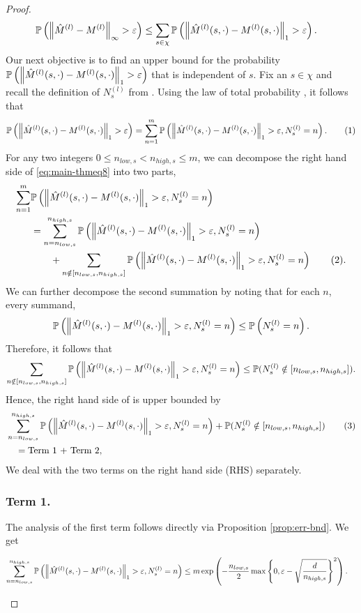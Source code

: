\documentclass[opre,sglanonrev]{informs4}
\numberwithin{equation}{section}
\newcommand{\pow}[1]{^{(#1)}}
\newcommand{\Pbb}{\mathbb{P}}
\newcommand{\hatmls}{\Hat{M}^{(l)}(s,\cdot)}
\newcommand{\mls}{{M}^{(l)}(s,\cdot)}
\newcommand\numberthis{\addtocounter{equation}{1}\tag{\theequation}}
\newcommand{\prob}{\Pbb}
\newcommand{\eps}{\varepsilon}
\renewcommand{\epsilon}{\eps}
\begin{document}
\begin{APPENDICES}
\begin{proof}
\begin{align*}
    \prob\left(\left\|\Hat{M}^{(l)}-M^{(l)}\right\|_{\infty}>\epsilon  \right) & \leq \sum_{s\in\chi} \prob\left(\left\|\hatmls-\mls\right\|_1 > \epsilon\right).
\end{align*}
Our next objective is to find an upper bound for the probability $\prob\left(\left\|\hatmls-\mls\right\|_1 > \epsilon\right)$ that is independent of $s$.
Fix an $s \in \chi$ and recall the definition of $N_s\pow{l}$ from . Using the law of total probability \citep[Proposition 4.1]{gut2005probability}, it follows that
\begin{align*}
    \prob\left(\left\|\hatmls-\mls\right\|_1 > \epsilon\right)=\sum_{n=1}^m \prob\left(\left\|\hatmls-\mls\right\|_1 > \epsilon, N_s^{(l)}=n \right).\numberthis\label{eq:main-thmeq8}
\end{align*}
For any two integers $0 \leq n_{low,s} < n_{high,s} \leq m$, we can decompose the right hand side of \cref{eq:main-thmeq8} into two parts, 
\begin{align*}
     \sum_{n=1}^{m} & \prob\left(\left\|\hatmls-\mls\right\|_1 > \epsilon, N_s^{(l)}=n \right)\\ & = \sum_{n=n_{low,s}}^{n_{high,s}} \prob\left(\left\|\hatmls-\mls\right\|_1 > \epsilon, N_s^{(l)}=n \right)\\
     & \qquad +\sum_{n\notin [n_{low,s} ,n_{high,s}]} \prob\left(\left\|\hatmls-\mls\right\|_1 > \epsilon, N_s^{(l)}=n \right)\numberthis\label{eq:main-thmeq1}.
\end{align*}
We can further decompose the second summation by noting that for each $n$, every summand,
\[
\prob\left(\left\|\hatmls-\mls\right\|_1 > \epsilon, N_s^{(l)}=n \right) \leq \prob\left(N_s^{(l)}=n \right).
\]
Therefore, it follows that
\[
\sum_{n\notin [n_{low,s} ,n_{high,s}]} \prob\left(\left\|\hatmls-\mls\right\|_1 > \epsilon, N_s^{(l)}=n \right)\leq \prob(N_s^{(l)}\notin [n_{low,s} ,n_{high,s}]).
\]
Hence, the right hand side of  is upper bounded by
\begin{align*}
    & \sum_{n=n_{low,s}}^{n_{high,s}} \prob\left(\left\|\hatmls-\mls\right\|_1 > \epsilon, N_s^{(l)}=n \right) +\prob(N_s^{(l)}\notin [n_{low,s} ,n_{high,s}]) \numberthis \label{eq:prob_sum}\\
    & \quad = \text{Term 1 + Term 2},
\end{align*}
We deal with the two terms on the right hand side (RHS) separately. 
\subsubsection*{Term 1.} 
The analysis of the first term follows directly via Proposition \ref{prop:err-bnd}. We get
\begin{small}
\begin{align*}
\sum_{n=n_{low,s}}^{n_{high,s}} \prob\left(\left\|\hatmls-\mls\right\|_1 > \epsilon, N_s^{(l)}=n \right)&\leq m\exp\left({-\frac{n_{low,s}}{2} \max \left\{0,\epsilon-\sqrt{\frac{d}{n_{high,s}}}\right\}^2}\right).
\end{align*}
\end{small}

\end{proof}
\end{APPENDICES}
\end{document}
